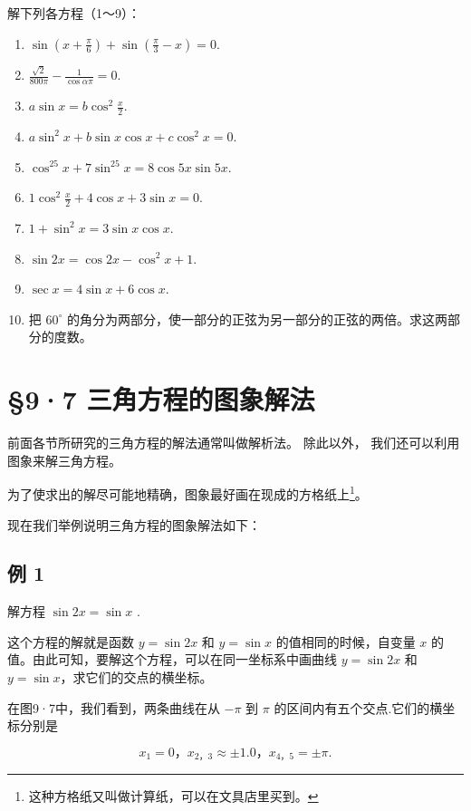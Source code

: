 解下列各方程（1～9）：

\begin{enumerate}
\item
  \(\sin \left(x + \frac{\pi}{6}\right) + \sin \left(\frac{\pi}{3} - x\right) = 0.\)
\item
  \(\frac{\sqrt{2}}{800\pi} - \frac{1}{\cos\alpha\pi} = 0.\)
\item
  \(a\sin x = b\cos^2\frac{x}{2}\).
\item
  \(a\sin^2 x + b\sin x\cos x + c\cos^2 x = 0.\)
\item
  \(\cos^25x + 7\sin^25x = 8\cos 5x\sin 5x.\)
\item
  \(1 \cos^2 \frac{x}{2} + 4 \cos x + 3 \sin x = 0.\)
\item
  \(1 + \sin^2 x = 3\sin x\cos x.\)
\item
  \(\sin 2x = \cos 2x - \cos^2 x + 1.\)
\item
  \(\sec x = 4\sin x + 6\cos x.\)
\item
  把 \(60^{\circ}\)
  的角分为两部分，使一部分的正弦为另一部分的正弦的两倍。求这两部分的度数。
\end{enumerate}

\section{§9·7 三角方程的图象解法}

前面各节所研究的三角方程的解法通常叫做解析法。 除此以外，
我们还可以利用图象来解三角方程。

为了使求出的解尽可能地精确，图象最好画在现成的方格纸上\footnote{这种方格纸又叫做计算纸，可以在文具店里买到。}。

现在我们举例说明三角方程的图象解法如下：

\subsection{例 1}

解方程 \(\sin 2x = \sin x\) .

 这个方程的解就是函数 \(y = \sin 2x\) 和 \(y = \sin x\)
的值相同的时候，自变量 \(x\)
的值。由此可知，要解这个方程，可以在同一坐标系中画曲线 \(y = \sin 2x\)
和 \(y = \sin x\)，求它们的交点的横坐标。

在图9·7中，我们看到，两条曲线在从 \(-\pi\) 到 \(\pi\)
的区间内有五个交点.它们的横坐标分别是

\[
x _ {1} = 0\text{，} x _ {2\text{，} 3} \approx \pm 1.0\text{，} x _ {4\text{，} 5} = \pm \pi .
\]

